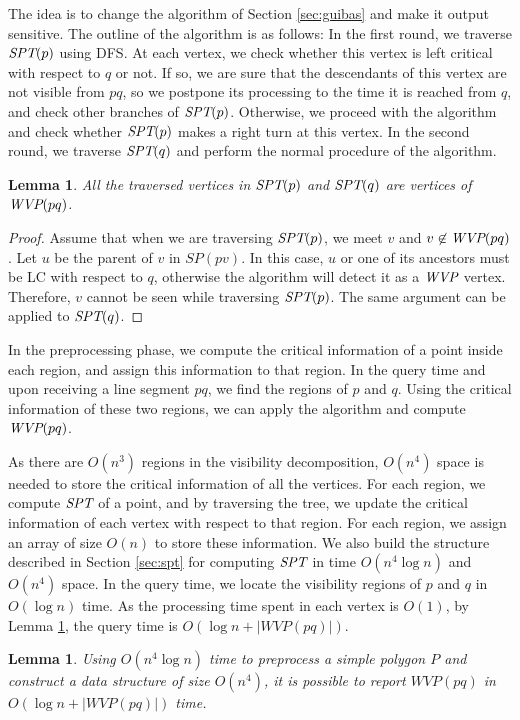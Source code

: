\documentclass[5p]{elsarticle}
\newtheorem{lemma}[theorem]{Lemma}
\def\WVP{\mbox{\it{WVP}}}
\def\SPT{\mbox{\it{SPT}}}
\def\P{\mbox{${P}$}}
\begin{document}
The idea is to change the algorithm of Section \ref{sec:guibas} and
make it output sensitive. The outline of the algorithm is
as follows: In the first round, we traverse $\SPT(p)$ using
DFS. At each vertex, we check whether this vertex is left
critical with respect to $q$ or not. If so, we are sure that the
descendants of this vertex are not visible from $pq$, so we
postpone its processing to the time it is reached from $q$,
and check other branches of $\SPT(p)$. Otherwise, we proceed
with the algorithm and check whether $\SPT(p)$ makes a
right turn at this vertex. In the second round,  we traverse $\SPT(q)$ and 
perform the normal procedure of the algorithm.


\begin{lemma} \label{lemma3}
All the traversed vertices in $\SPT(p)$ and $\SPT(q)$ are vertices of $\WVP(pq)$.
\end{lemma}
\begin{proof}
Assume that when we are traversing $\SPT(p)$, we meet $v$ and $v \not\in \WVP(pq)$.
Let $u$ be the parent of $v$ in $SP(pv)$. In this case, $u$ or one of its ancestors 
must be LC with respect to $q$, otherwise the algorithm will detect it as a $\WVP$ vertex. 
Therefore, $v$ cannot be seen while traversing $\SPT(p)$. The same argument can be applied to $\SPT(q)$.
\end{proof}


In the preprocessing phase, we compute the critical
information of a point inside each region, and assign this
information to that region.
In the query time and upon receiving a line segment $pq$, 
we find the regions of $p$ and $q$.
Using the critical information of these two regions, 
we can apply the algorithm and compute $\WVP(pq)$.

As there are $O(n^3)$ regions in the visibility decomposition, 
$O(n^4)$ space is needed to store the critical information of all the vertices. 
For each region, we compute $\SPT$ of a point, 
and by traversing the tree, we update the critical
information of each vertex with respect to that region.  
For each region, we assign an array of size $O(n)$ to store these information.
We also build the structure described 
in Section \ref{sec:spt} for computing $\SPT$ in time $O(n^4 \log n)$ and $O(n^4)$ space.
In the query time, we locate the visibility regions of $p$ and $q$ in $O(\log n)$ time. 
As the processing time spent in each vertex is $O(1)$, by Lemma \ref{lemma3}, 
the query time is $O(\log n + |WVP(pq)|)$.

\begin{lemma} \label{lem:primaryresult}
Using $O(n^4 \log n)$ time to preprocess a simple polygon $\P$ and construct a 
data structure of size $O(n^4)$, it is possible to report $WVP(pq)$ in $O(\log n + |WVP(pq)|)$ time.
\end{lemma}
\end{document}
